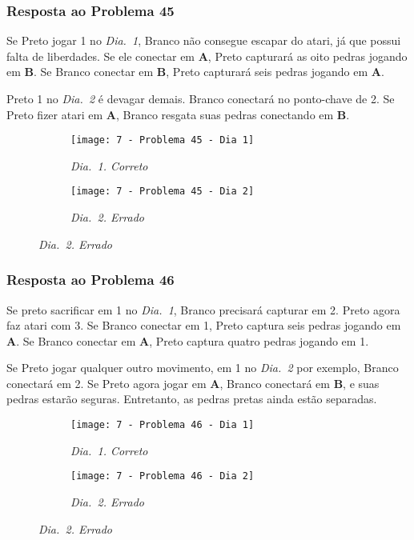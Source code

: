 \pagebreak

\subsubsection*{Resposta ao Problema 45}

Se Preto jogar 1 no \emph{Dia.\@~1}, Branco não consegue escapar do atari, já que possui falta de liberdades. Se ele conectar em \textbf{A}, Preto capturará as oito pedras jogando em \textbf{B}. Se Branco conectar em \textbf{B}, Preto capturará seis pedras jogando em \textbf{A}.
    
Preto 1 no \emph{Dia.\@~2} é devagar demais. Branco conectará no ponto-chave de 2. Se Preto fizer atari em \textbf{A}, Branco resgata suas pedras conectando em \textbf{B}.

\begin{figure}[h!]
    \centering
    \begin{subfigure}[t]{.31\textwidth}
        \texttt{[image: 7 - Problema 45 - Dia 1]}
        \caption*{\emph{Dia.\@~1. Correto}}
    \end{subfigure}
    \hspace{1cm}
    \begin{subfigure}[t]{.31\textwidth}
        \texttt{[image: 7 - Problema 45 - Dia 2]}
        \caption*{\emph{Dia.\@~2. Errado}}
    \end{subfigure}
\end{figure}

\subsubsection*{Resposta ao Problema 46}

Se preto sacrificar em 1 no \emph{Dia.\@~1}, Branco precisará capturar em 2. Preto agora faz atari com 3. Se Branco conectar em 1, Preto captura seis pedras jogando em \textbf{A}. Se Branco conectar em \textbf{A}, Preto captura quatro pedras jogando em 1.
    
Se Preto jogar qualquer outro movimento, em 1 no \emph{Dia.\@~2} por exemplo, Branco conectará em 2. Se Preto agora jogar em \textbf{A}, Branco conectará em \textbf{B}, e suas pedras estarão seguras. Entretanto, as pedras pretas ainda estão separadas.

\begin{figure}[h!]
    \centering
    \begin{subfigure}[t]{.31\textwidth}
        \texttt{[image: 7 - Problema 46 - Dia 1]}
        \caption*{\emph{Dia.\@~1. Correto}}
    \end{subfigure}
    \hspace{1cm}
    \begin{subfigure}[t]{.31\textwidth}
        \texttt{[image: 7 - Problema 46 - Dia 2]}
        \caption*{\emph{Dia.\@~2. Errado}}
    \end{subfigure}
\end{figure}